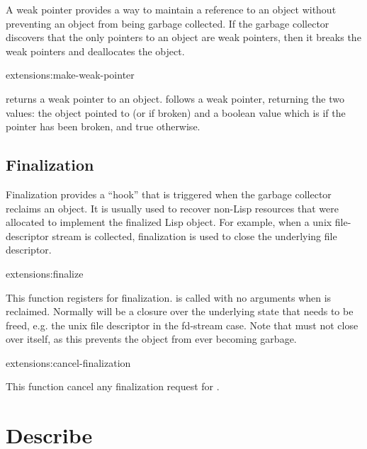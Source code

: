 A weak pointer provides a way to maintain a reference to an object
without preventing an object from being garbage collected.  If the
garbage collector discovers that the only pointers to an object are
weak pointers, then it breaks the weak pointers and deallocates the
object.

\begin{defun}{extensions:}{make-weak-pointer}{}
  
   returns a weak pointer to an object.
   follows a weak pointer, returning the two
  values: the object pointed to (or \false{} if broken) and a boolean
  value which is \false{} if the pointer has been broken, and true
  otherwise.
\end{defun}


\subsection{Finalization}

Finalization provides a ``hook'' that is triggered when the garbage
collector reclaims an object.  It is usually used to recover non-Lisp
resources that were allocated to implement the finalized Lisp object.
For example, when a unix file-descriptor stream is collected,
finalization is used to close the underlying file descriptor.

\begin{defun}{extensions:}{finalize}{}
  
  This function registers  for finalization.
   is called with no arguments when  is
  reclaimed.  Normally  will be a closure over the
  underlying state that needs to be freed, e.g. the unix file
  descriptor in the fd-stream case.  Note that  must not
  close over  itself, as this prevents the object from
  ever becoming garbage.
\end{defun}

\begin{defun}{extensions:}{cancel-finalization}{}
  
  This function cancel any finalization request for .
\end{defun}


\section{Describe}

